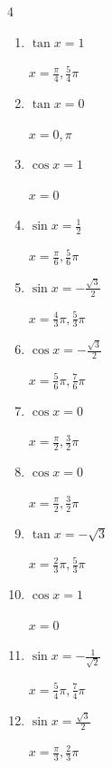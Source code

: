 \begin{multicols}{4}
\begin{enumerate}
  \item $\displaystyle \tan{x}  = 1$

        $\displaystyle x = \frac{\pi}{4} , \frac{5}{4}\pi$

  \item $\displaystyle \tan{x}  = 0$

        $\displaystyle x = 0 , \pi$

  \item $\displaystyle \cos{x}  = 1$

        $\displaystyle x = 0$

  \item $\displaystyle \sin{x}  = \frac{1}{2}$

        $\displaystyle x = \frac{\pi}{6} , \frac{5}{6}\pi$

  \item $\displaystyle \sin{x}  = -\frac{\sqrt{3}}{2}$

        $\displaystyle x = \frac{4}{3}\pi , \frac{5}{3}\pi$

  \item $\displaystyle \cos{x}  = -\frac{\sqrt{3}}{2}$

        $\displaystyle x = \frac{5}{6}\pi , \frac{7}{6}\pi$

  \item $\displaystyle \cos{x}  = 0$

        $\displaystyle x = \frac{\pi}{2} , \frac{3}{2}\pi$

  \item $\displaystyle \cos{x}  = 0$

        $\displaystyle x = \frac{\pi}{2} , \frac{3}{2}\pi$

  \item $\displaystyle \tan{x}  = -\sqrt{3}$

        $\displaystyle x = \frac{2}{3}\pi , \frac{5}{3}\pi$

  \item $\displaystyle \cos{x}  = 1$

        $\displaystyle x = 0$

\columnbreak %

  \item $\displaystyle \sin{x}  = -\frac{1}{\sqrt{2}}$

        $\displaystyle x = \frac{5}{4}\pi , \frac{7}{4}\pi$

  \item $\displaystyle \sin{x}  = \frac{\sqrt{3}}{2}$

        $\displaystyle x = \frac{\pi}{3} , \frac{2}{3}\pi$


\end{enumerate}
\end{multicols}

